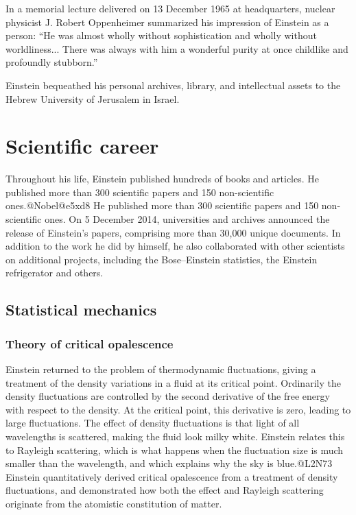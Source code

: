 \documentclass[twoside]{memoir}
\begin{document}
In a memorial lecture delivered on 13 December 1965 at  headquarters, nuclear physicist J. Robert Oppenheimer summarized his impression of Einstein as a person: \enquote{He was almost wholly without sophistication and wholly without worldliness... There was always with him a wonderful purity at once childlike and profoundly stubborn.}\cite{aJHxn}

Einstein bequeathed his personal archives, library, and intellectual assets to the Hebrew University of Jerusalem in Israel.
\part{Scientific career}
Throughout his life, Einstein published hundreds of books and articles. He published more than 300 scientific papers and 150 non-scientific ones.@Nobel@e5xd8
He published more than 300 scientific papers and 150 non-scientific ones. On 5 December 2014, universities and archives announced the release of Einstein's papers, comprising more than 30,000 unique documents. In addition to the work he did by himself, he also collaborated with other scientists on additional projects, including the Bose--Einstein statistics, the Einstein refrigerator and others.
\chapter{Statistical mechanics}
\section{Theory of critical opalescence}
Einstein returned to the problem of thermodynamic fluctuations, giving a treatment of the density variations in a fluid at its critical point. Ordinarily the density fluctuations are controlled by the second derivative of the free energy with respect to the density. At the critical point, this derivative is zero, leading to large fluctuations. The effect of density fluctuations is that light of all wavelengths is scattered, making the fluid look milky white. Einstein relates this to Rayleigh scattering, which is what happens when the fluctuation size is much smaller than the wavelength, and which explains why the sky is blue.@L2N73 Einstein quantitatively derived critical opalescence from a treatment of density fluctuations, and demonstrated how both the effect and Rayleigh scattering originate from the atomistic constitution of matter.
\end{document}
